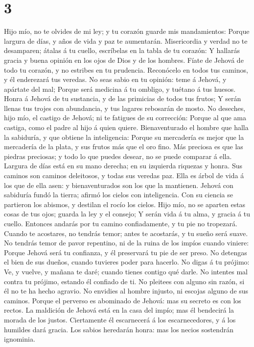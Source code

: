 \hypertarget{section-2}{%
\section{3}\label{section-2}}

 Hijo mío, no te olvides de mi ley; y tu corazón guarde mis
mandamientos:  Porque largura de días, y años de vida y paz
te aumentarán.  Misericordia y verdad no te desamparen;
átalas á tu cuello, escríbelas en la tabla de tu corazón:  Y
hallarás gracia y buena opinión en los ojos de Dios y de los hombres.
 Fíate de Jehová de todo tu corazón, y no estribes en tu
prudencia.  Reconócelo en todos tus caminos, y él enderezará
tus veredas.  No seas sabio en tu opinión: teme á Jehová, y
apártate del mal;  Porque será medicina á tu ombligo, y
tuétano á tus huesos.  Honra á Jehová de tu sustancia, y de
las primicias de todos tus frutos;  Y serán llenas tus
trojes con abundancia, y tus lagares rebosarán de mosto. 
No deseches, hijo mío, el castigo de Jehová; ni te fatigues de su
corrección:  Porque al que ama castiga, como el padre al
hijo á quien quiere.  Bienaventurado el hombre que halla la
sabiduría, y que obtiene la inteligencia:  Porque su
mercadería es mejor que la mercadería de la plata, y sus frutos más que
el oro fino.  Más preciosa es que las piedras preciosas; y
todo lo que puedes desear, no se puede comparar á ella. 
Largura de días está en su mano derecha; en su izquierda riquezas y
honra.  Sus caminos son caminos deleitosos, y todas sus
veredas paz.  Ella es árbol de vida á los que de ella asen:
y bienaventurados son los que la mantienen.  Jehová con
sabiduría fundó la tierra; afirmó los cielos con inteligencia.
 Con su ciencia se partieron los abismos, y destilan el
rocío los cielos.  Hijo mío, no se aparten estas cosas de
tus ojos; guarda la ley y el consejo;  Y serán vida á tu
alma, y gracia á tu cuello.  Entonces andarás por tu camino
confiadamente, y tu pie no tropezará.  Cuando te acostares,
no tendrás temor; antes te acostarás, y tu sueño será suave.
 No tendrás temor de pavor repentino, ni de la ruina de los
impíos cuando viniere:  Porque Jehová será tu confianza, y
él preservará tu pie de ser preso.  No detengas el bien de
sus dueños, cuando tuvieres poder para hacerlo.  No digas á
tu prójimo: Ve, y vuelve, y mañana te daré; cuando tienes contigo qué
darle.  No intentes mal contra tu prójimo, estando él
confiado de ti.  No pleitees con alguno sin razón, si él no
te ha hecho agravio.  No envidies al hombre injusto, ni
escojas alguno de sus caminos.  Porque el perverso es
abominado de Jehová: mas su secreto es con los rectos.  La
maldición de Jehová está en la casa del impío; mas él bendecirá la
morada de los justos.  Ciertamente él escarnecerá á los
escarnecedores, y á los humildes dará gracia.  Los sabios
heredarán honra: mas los necios sostendrán ignominia.

